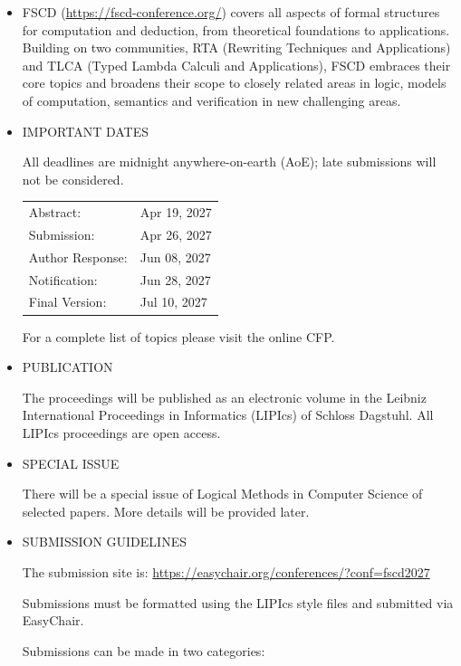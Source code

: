 \documentclass[prodmode,acmtecs]{acmsmall} %
\begin{document}
\begin{itemize}\item  FSCD (\href{https://fscd-conference.org/}{https://fscd-conference.org/}) covers all aspects of formal structures for computation and deduction, from theoretical foundations to applications. Building on two communities, RTA (Rewriting Techniques and Applications) and TLCA (Typed Lambda Calculi and Applications), FSCD embraces their core topics and broadens their scope to closely related areas in logic, models of computation, semantics and verification in new challenging areas. 
 
\item  IMPORTANT DATES 
 
  All deadlines are midnight anywhere-on-earth (AoE); late submissions will not be considered. 
 
\begin{tabulary}{\linewidth}{LL}Abstract:  & Apr 19, 2027 \\
Submission:  & Apr 26, 2027 \\
Author Response:  & Jun 08, 2027 \\
Notification:  & Jun 28, 2027 \\
Final Version:  & Jul 10, 2027 \\
\end{tabulary}
 
  For a complete list of topics please visit the online CFP. 
 
\item  PUBLICATION 
 
  The proceedings will be published as an electronic volume in the  Leibniz International Proceedings in Informatics (LIPIcs) of Schloss Dagstuhl. All LIPIcs proceedings are open access. 
 
\item  SPECIAL ISSUE 
 
  There will be a special issue of Logical Methods in Computer Science of selected papers. More details will be provided later. 
 
\item  SUBMISSION GUIDELINES  
 
  The submission site is: \href{https://easychair.org/conferences/?conf=fscd2027}{https://easychair.org/conferences/?conf=fscd2027} 
 
  Submissions must be formatted using the LIPIcs style files and submitted via EasyChair. 
 
  Submissions can be made in two categories: 
 

\end{itemize}
\end{document}
